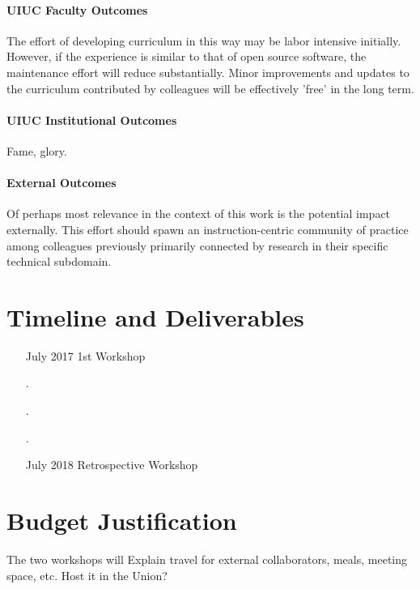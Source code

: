 \documentclass[11pt]{article}
\begin{document}
          \paragraph{UIUC Faculty Outcomes}
          The effort of developing curriculum in this way may be labor 
          intensive initially. However, if the experience is similar to that of 
          open source software, the maintenance effort will reduce 
          substantially. Minor improvements and updates to the curriculum 
          contributed by colleagues will be effectively 'free' in the long 
          term. 

          \paragraph{UIUC Institutional Outcomes}

          Fame, glory.

          \paragraph{External Outcomes}

          Of perhaps most relevance in the context of this work is the 
          potential impact externally. This effort should spawn an 
          instruction-centric community of 
          practice among colleagues previously primarily connected by research 
          in their specific technical subdomain. 

          \section*{Timeline and Deliverables}

          \begin{itemize}
                  \item[July 2017] 1st Workshop
                  \item[.] 
                  \item[.] 
                  \item[.] 
                  \item[July 2018] Retrospective Workshop
          \end{itemize}

          \section*{Budget Justification}
          The two workshops will 
          Explain travel for external collaborators, meals, meeting space, etc. 
          Host it in the Union?
\end{document}
